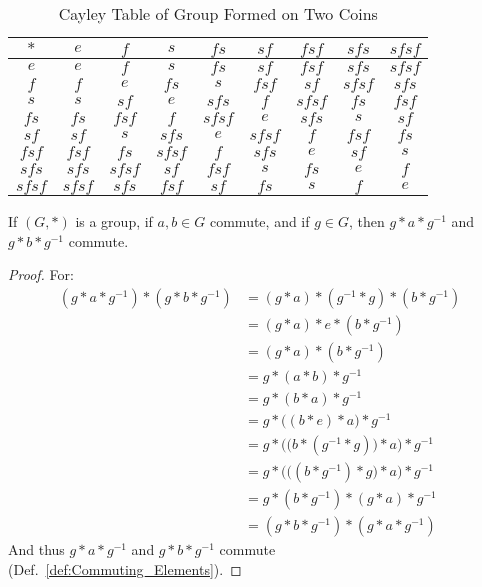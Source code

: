     \begin{table}[H]
        \centering
        \captionsetup{type=table}
        \begin{tabular}{c|cccccccc}
            $*$&$e$&$f$&$s$&$fs$&$sf$&$fsf$&$sfs$&$sfsf$\\
            \hline
            $e$&$e$&$f$&$s$&$fs$&$sf$&$fsf$&$sfs$&$sfsf$\\
            $f$&$f$&$e$&$fs$&$s$&$fsf$&$sf$&$sfsf$&$sfs$\\
            $s$&$s$&$sf$&$e$&$sfs$&$f$&$sfsf$&$fs$&$fsf$\\
            $fs$&$fs$&$fsf$&$f$&$sfsf$&$e$&$sfs$&$s$&$sf$\\
            $sf$&$sf$&$s$&$sfs$&$e$&$sfsf$&$f$&$fsf$&$fs$\\
            $fsf$&$fsf$&$fs$&$sfsf$&$f$&$sfs$&$e$&$sf$&$s$\\
            $sfs$&$sfs$&$sfsf$&$sf$&$fsf$&$s$&$fs$&$e$&$f$\\
            $sfsf$&$sfsf$&$sfs$&$fsf$&$sf$&$fs$&$s$&$f$&$e$
        \end{tabular}
        \caption{Cayley Table of Group Formed on Two Coins}
        \label{tab:Group_Formed_on_Two_Coins}
    \end{table}
    \begin{theorem}
        If $(G,*)$ is a group, if $a,b\in{G}$ commute, and if $g\in{G}$, then
        $g*a*g^{\minus{1}}$ and $g*b*g^{\minus{1}}$ commute.
    \end{theorem}
    \begin{proof}
        For:
        \begin{align}
            (g*a*g^{\minus{1}})*(g*b*g^{\minus{1}})
            &=(g*a)*(g^{\minus{1}}*g)*(b*g^{\minus{1}})
            \tag{Associativity}\\
            &=(g*a)*e*(b*g^{\minus{1}})
            \tag{Inverse}\\
            &=(g*a)*(b*g^{\minus{1}})
            \tag{Identity}\\
            &=g*(a*b)*g^{\minus{1}}
            \tag{Associativity}\\
            &=g*(b*a)*g^{\minus{1}}
            \tag{Commutativity}\\
            &=g*\big((b*e)*a\big)*g^{\minus{1}}
            \tag{Identity}\\
            &=g*\Big(\big(b*(g^{\minus{1}}*g)\big)*a\Big)*g^{\minus{1}}
            \tag{Inverse}\\
            &=g*\Big(\big((b*g^{\minus{1}})*g\big)*a)*g^{\minus{1}}
            \tag{Associativity}\\
            &=g*(b*g^{\minus{1}})*(g*a)*g^{\minus{1}}
            \tag{Associativity}\\
            &=(g*b*g^{\minus{1}})*(g*a*g^{\minus{1}})
            \tag{Associativity}
        \end{align}
        And thus $g*a*g^{\minus{1}}$ and $g*b*g^{\minus{1}}$ commute
        (Def.~\ref{def:Commuting_Elements}).
    \end{proof}

